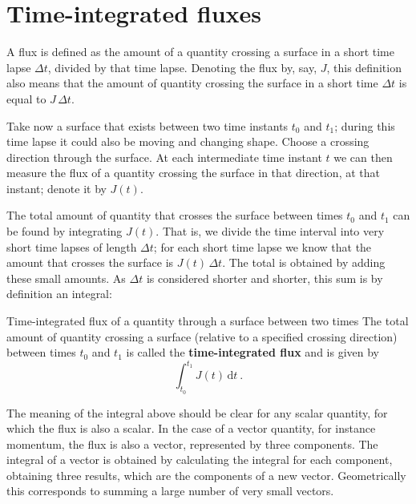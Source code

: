 \documentclass[a4paper,12pt,%
onecolumn,oneside,%
british%
]{memoir}
\newcommand*{\di}{\mathrm{d}}%
\newcommand*{\incr}{\Delta}%
\renewcommand*{\|}[1][]{\nonscript\:#1\vert\nonscript\:\mathopen{}}
\newcommand*{\yti}{t_{0}}
\newcommand*{\ytf}{t_{1}}
\newcommand*{\Dt}{\incr t}
\newcommand*{\yJ}{J}
\begin{document}
%
%


\section{Time-integrated fluxes}
\label{sec:total_flow}

A flux is defined as the amount of a quantity crossing a surface in a short time lapse $\Dt$, divided by that time lapse. Denoting the flux by, say, $\yJ$, this definition also means that the amount of quantity crossing the surface in a short time $\Dt$ is equal to $\yJ\,\Dt$.

Take now a surface that exists between two time instants $\yti$ and $\ytf$; during this time lapse it could also be moving and changing shape. Choose a crossing direction through the surface. At each intermediate time instant $t$ we can then measure the flux of a quantity crossing the surface in that direction, at that instant; denote it by $\yJ(t)$.

The total amount of quantity that crosses the surface between times $\yti$ and $\ytf$ can be found by integrating $\yJ(t)$. That is, we divide the time interval into very short time lapses of length $\Dt$; for each short time lapse we know that the amount that crosses the surface is $\yJ(t)\,\Dt$. The total is obtained by adding these small amounts. As $\Dt$ is considered shorter and shorter, this sum is by definition an integral:
\begin{definition}{Time-integrated flux of a quantity through a surface between two times}
The total amount of quantity crossing a surface (relative to a specified crossing direction) between times $\yti$ and $\ytf$ is called the \textbf{time-integrated flux} and is given by
  \begin{equation}
    \label{eq:total_flow_integral}
     \int_{\yti}^{\ytf}\!\! \yJ(t)\,\di t\ .
  \end{equation}
\end{definition}

The meaning of the integral above should be clear for any scalar quantity, for which the flux is also a scalar. In the case of a vector quantity, for instance momentum, the flux is also a vector, represented by three components. The integral of a vector is obtained by calculating the integral for each component, obtaining three results, which are the components of a new vector. Geometrically this corresponds to summing a large number of very small vectors.
\end{document}
